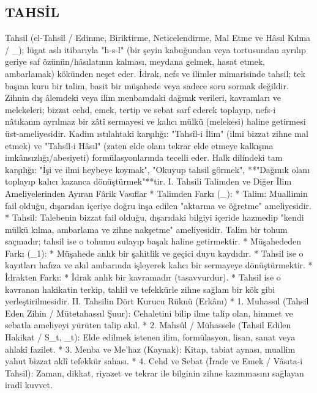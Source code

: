 \documentclass[11pt,a4paper]{article}
\begin{document}
\subsection{TAHSİL}



Tahsil (el-Tahsîl / Edinme, Biriktirme, Neticelendirme, Mal Etme ve Hâsıl Kılma / _{}); lügat aslı itibarıyla "h-s-l" (bir şeyin kabuğundan veya tortusundan ayrılıp geriye saf özünün/hâsılatının kalması, meydana gelmek, hasat etmek, ambarlamak) kökünden neşet eder.
İdrak, nefs ve ilimler mimarisinde tahsil; tek başına kuru bir talim, basit bir müşahede veya sadece soru sormak değildir. Zihnin dış âlemdeki veya ilim menbaındaki dağınık verileri, kavramları ve melekeleri; bizzat cehd, emek, tertip ve sebat sarf ederek toplayıp, nefs-i nâtıkanın ayrılmaz bir zâtî sermayesi ve kalıcı mülkü (melekesi) haline getirmesi üst-ameliyesidir.
Kadim ıstılahtaki karşılığı: "Tahsîl-i İlim" (ilmi bizzat zihne mal etmek) ve "Tahsîl-i Hâsıl" (zaten elde olanı tekrar elde etmeye kalkışma imkânsızlığı/abesiyeti) formülasyonlarında tecelli eder.
Halk dilindeki tam karşılığı: "İşi ve ilmi heybeye koymak", "Okuyup tahsil görmek", **"Dağınık olanı toplayıp kalıcı kazanca dönüştürmek"**tir.
I. Tahsili Talimden ve Diğer İlim Ameliyelerinden Ayıran Fârik Vasıflar
 * Talimden Farkı (_{}):
   * Talim: Muallimin fail olduğu, dışarıdan içeriye doğru inşa edilen "aktarma ve öğretme" ameliyesidir.
   * Tahsil: Talebenin bizzat fail olduğu, dışarıdaki bilgiyi içeride hazmedip "kendi mülkü kılma, ambarlama ve zihne nakşetme" ameliyesidir. Talim bir tohum saçmadır; tahsil ise o tohumu sulayıp başak haline getirmektir.
 * Müşahededen Farkı (_1):
   * Müşahede anlık bir şahitlik ve geçici duyu kaydıdır.
   * Tahsil ise o kayıtları hafıza ve akıl ambarında işleyerek kalıcı bir sermayeye dönüştürmektir.
 * İdrakten Farkı:
   * İdrak anlık bir kavramadır (tasavvurdur).
   * Tahsil ise o kavranan hakikatin terkip, tahlil ve tefekkürle zihne sağlam bir kök gibi yerleştirilmesidir.
II. Tahsilin Dört Kurucu Rüknü (Erkânı)
 * 1. Muhassıl (Tahsil Eden Zihin / Mütetahassıl Şuur): Cehaletini bilip ilme talip olan, himmet ve sebatla ameliyeyi yürüten talip akıl.
 * 2. Mahsûl / Mühassele (Tahsil Edilen Hakikat / S_t, _t): Elde edilmek istenen ilim, formülasyon, lisan, sanat veya ahlakî fazilet.
 * 3. Menba ve Me'haz (Kaynak): Kitap, tabiat aynası, muallim yahut bizzat aklî tefekkür sahası.
 * 4. Cehd ve Sebat (İrade ve Emek / Vâsıta-i Tahsil): Zaman, dikkat, riyazet ve tekrar ile bilginin zihne kazınmasını sağlayan iradî kuvvet.
\end{document}

